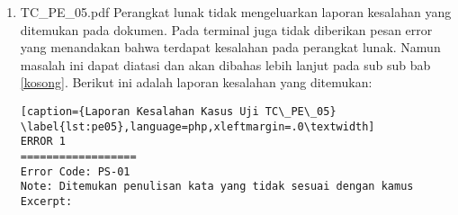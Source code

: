 \begin{enumerate}
\begin{lstlisting}[caption={Laporan Kesalahan Kasus Uji TC\_PE\_04}	\label{lst:pe04},language=php,xleftmargin=.0\textwidth]
ERROR 21
==================
Error Code: KAL-03
Note: Ada data skripsi yang belum dilengkapi pada halaman cover
Excerpt: SKRIPSI APLIKASI PRATINJAU 3 DIMENSI BERBASIS WEB Nancy Valentina 
NPM: 2014730049 PROGRAM STUDI TEKNIK INFORMATIKA FAKULTAS TEKNOLOGI 
INFORMASI DAN SAINS UNIVERSITAS KATOLIK PARAHYANGAN tahun UNDERGRADUATE 
THESIS JUDUL BAHASA INGGRIS Nancy Valentina NPM: 2014730049 DEPARTMENT OF 
INFORMATICS FACULTY OF INFORMATION TECHNOLOGY AND SCIENCES PARAHYANGAN 
CATHOLIC UNIVERSITY tahun

ERROR 22
==================
Error Code: NAT-01
Note: Referensi tidak dirujuk dengan baik, lakukan perintah PDFLatex->BibTex->
PDFLatex->PDFLatex untuk memperbaikinya
Excerpt: Canvas pada HTML menyediakan suatu destinasi untuk pembangunan objek 
secara programatik pada halaman web dan memungkinkan menampilkan objek yang 
sedang dibangun menggunakan API pembangun objek yang berbeda [ ?]
\end{lstlisting}
	
	\item TC\_PE\_05.pdf \newline
	Perangkat lunak tidak mengeluarkan laporan kesalahan yang ditemukan pada dokumen. Pada terminal juga tidak diberikan pesan error yang menandakan bahwa terdapat kesalahan pada perangkat lunak. Namun masalah ini dapat diatasi dan akan dibahas lebih lanjut pada sub sub bab \ref{kosong}. Berikut ini adalah laporan kesalahan yang ditemukan:

\begin{lstlisting}[caption={Laporan Kesalahan Kasus Uji TC\_PE\_05}	\label{lst:pe05},language=php,xleftmargin=.0\textwidth]
ERROR 1
==================
Error Code: PS-01
Note: Ditemukan penulisan kata yang tidak sesuai dengan kamus
Excerpt: 


\end{lstlisting}
\end{enumerate}
